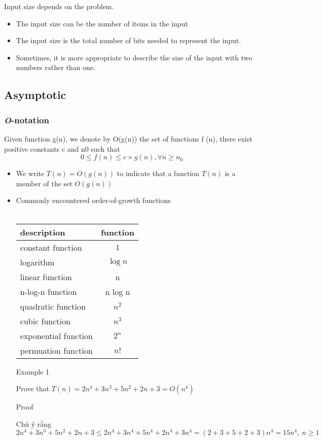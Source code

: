 \documentclass{article}
\begin{document}
Input size depends on the problem.
\begin{itemize}
    \item The input size can be the number of items in the input
    \item The input size is the total number of bits needed to represent the input.
    \item Sometimes, it is more appropriate to describe the size of the input with two numbers rather than one.
\end{itemize}

\subsection{Asymptotic}
\subsubsection{\textit{O}-notation}

Given function g(n), we denote by O(g(n)) the set of functions {f (n)}, there exist positive constants c and n0 such that \begin{equation}
    0 \leq f(n) \leq c\times g(n), \forall n \geq  n_0    
\end{equation}

\begin{itemize}
    \item We write $T(n) = O(g(n))$ to indicate that a function $T(n)$ is a member of the set $O(g(n))$
    \item Commonly encountered order-of-growth functions\\\
    
    \begin{center}
        \begin{tabular}{lc}
            \toprule
            \textbf{description} &  function   \\
            \midrule
                constant function & $1$\\
                logarithm & $\log n$\\
                linear function & n\\
                n-log-n function & n log n\\
                quadratic function & $n^2$\\
                cubic function & $ n^3$ \\
                exponential function & $2^n$\\
                permuation function & $n!$\\
            \bottomrule
        \end{tabular}
        
        
    \end{center}
    Example 1 
        
        Prove that $T(n) = 2n^4 + 3n^3 + 5n^2 + 2n + 3 = O(n^4)$
        
        Proof 
        
        Chú ý rằng $$2n^4+3n^3+5n^2+2n+3 \leq 2n^4+3n^4+5n^4+2n^4+3n^4 = (2+3+5+2+3)n^4 = 15n^4,\: n \geq 1$$
\end{itemize}
\end{document}
